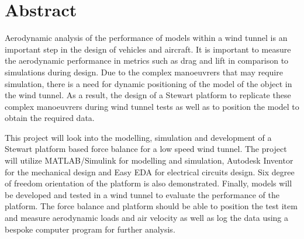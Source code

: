 
\section*{Abstract}
\label{sec:Abstract}
Aerodynamic analysis of the performance of models within a wind tunnel is an important step in the design of vehicles and aircraft. It is important to measure the aerodynamic performance in metrics such as drag and lift in comparison to simulations during design.
Due to the complex manoeuvrers that may require simulation, there is a need for dynamic positioning of the model of the object in the wind tunnel. As a result, the design of a Stewart platform to replicate these complex manoeuvrers during wind tunnel tests as well as to position the model to obtain the required data.

This project will look into the modelling, simulation and development of a Stewart
platform based force balance for a low speed wind tunnel. The project will utilize
MATLAB/Simulink for modelling and simulation, Autodesk Inventor for the mechanical
design and Easy EDA for electrical circuits design. Six degree of freedom orientation of the platform is also demonstrated. 
Finally, models will be developed and tested in a wind tunnel to evaluate the performance
of the platform. The force balance and platform should be able to position the test
item and measure aerodynamic loads and air velocity as well as log the data using a bespoke computer program for further analysis.




